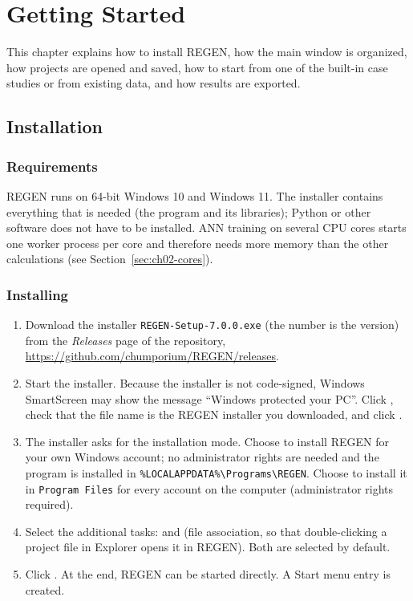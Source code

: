\chapter{Getting Started}\label{chap:2}
\label{ch:start}

This chapter explains how to install REGEN, how the main window is organized, how projects are opened and saved,
how to start from one of the built-in case studies or from existing data, and how results are exported.

\section{Installation}
\label{sec:ch02-install}

\subsection{Requirements}
REGEN runs on 64-bit Windows 10 and Windows 11. The installer contains everything that is needed (the program and
its libraries); Python or other software does not have to be installed. ANN training on several CPU cores starts one
worker process per core and therefore needs more memory than the other calculations (see
Section~\ref{sec:ch02-cores}).

\subsection{Installing}
\begin{enumerate}
  \item Download the installer \texttt{REGEN-Setup-7.0.0.exe} (the number is the version) from the
        \emph{Releases} page of the repository, \url{https://github.com/chumporium/REGEN/releases}.
  \item Start the installer. Because the installer is not code-signed,
        Windows SmartScreen may show the message ``Windows protected your PC''. Click , check that the
        file name is the REGEN installer you downloaded, and click .
  \item The installer asks for the installation mode. Choose  to install REGEN for your
        own Windows account; no administrator rights are needed and the program is installed in
        \texttt{\%LOCALAPPDATA\%\textbackslash Programs\textbackslash REGEN}. Choose  to
        install it in \texttt{Program Files} for every account on the computer (administrator rights required).
  \item Select the additional tasks:  and  (file
        association, so that double-clicking a project file in Explorer opens it in REGEN). Both are selected by
        default.
  \item Click . At the end, REGEN can be started directly. A Start menu entry  is created.
\end{enumerate}

